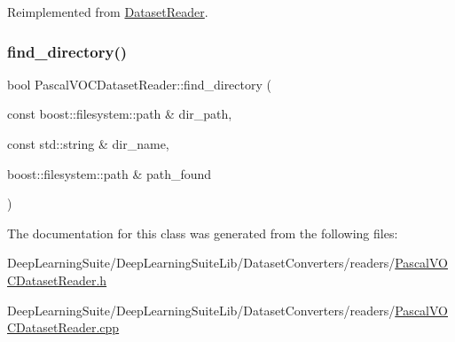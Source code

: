 Reimplemented from \hyperlink{class_dataset_reader_a732438244cec7c20294f93c6b635888c}{Dataset\+Reader}.

\mbox{\label{class_pascal_v_o_c_dataset_reader_a3b3e05816606147534b8af5b8c28bb29}} 
\subsubsection{\texorpdfstring{find\+\_\+directory()}{find\_directory()}}
{\footnotesize\ttfamily bool Pascal\+V\+O\+C\+Dataset\+Reader\+::find\+\_\+directory (\begin{DoxyParamCaption}\item[{const boost\+::filesystem\+::path \&}]{dir\+\_\+path,  }\item[{const std\+::string \&}]{dir\+\_\+name,  }\item[{boost\+::filesystem\+::path \&}]{path\+\_\+found }\end{DoxyParamCaption})}



The documentation for this class was generated from the following files\+:\begin{DoxyCompactItemize}
\item 
Deep\+Learning\+Suite/\+Deep\+Learning\+Suite\+Lib/\+Dataset\+Converters/readers/\hyperlink{_pascal_v_o_c_dataset_reader_8h}{Pascal\+V\+O\+C\+Dataset\+Reader.\+h}\item 
Deep\+Learning\+Suite/\+Deep\+Learning\+Suite\+Lib/\+Dataset\+Converters/readers/\hyperlink{_pascal_v_o_c_dataset_reader_8cpp}{Pascal\+V\+O\+C\+Dataset\+Reader.\+cpp}\end{DoxyCompactItemize}
